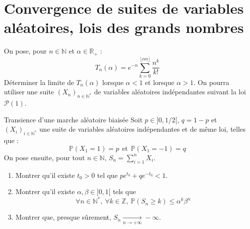 \documentclass[french,a4paper]{article}
\renewcommand{\P}{\mathbb{P}}
\newcommand{\N}{\mathbb{N}}
\newcommand{\Z}{\mathbb{Z}}
\newcommand{\R}{\mathbb{R}}
\newcommand{\st}{^*}
\theoremstyle{plain}
\theoremstyle{definition}
\theoremstyle{remark}
\begin{document}
\section{Convergence de suites de variables aléatoires, lois des grands nombres}

\begin{ex}{}
	On pose, pour $n\in\N$ et $\alpha\in\R_+$ : $$T_n(\alpha)=e^{-n}\sum_{k=0}^{\lfloor\alpha n\rfloor}\frac{n^k}{k!}$$ Déterminer la limite de $T_n(\alpha)$ lorsque $\alpha<1$ et lorsque $\alpha>1$. On pourra utiliser une suite $(X_n)_{n\in\N\st}$ de variables aléatoires indépendantes suivant la loi $\mathcal{P}(1)$.
\end{ex}

\begin{ex}{Transience d'une  marche aléatoire biaisée}
	Soit $p\in]0,1/2[$, $q=1-p$ et $(X_i)_{i\in\N\st}$ une suite de variables aléatoires indépendantes et de même loi, telles que : $$\P(X_1=1)=p\ \ \text{et}\ \ \P(X_1=-1)=q$$ On pose ensuite, pour tout $n\in\N$, $S_n=\displaystyle\sum_{i=1}^{n}X_i$.
	\begin{enumerate}
		\item Montrer qu'il existe $t_0>0$ tel que $pe^{t_0}+qe^{-t_0}<1$.
		\item Montrer qu'il existe $\alpha,\beta\in]0,1[$ tels que $$\forall n\in\N\st,\ \forall k\in\Z,\ \P(S_n\geqslant k)\leqslant\alpha^k\beta^n$$
		\item Montrer que, presque sûrement, $S_n\xrightarrow[n\to+\infty]{}-\infty$.
	\end{enumerate}
\end{ex}
\end{document}
